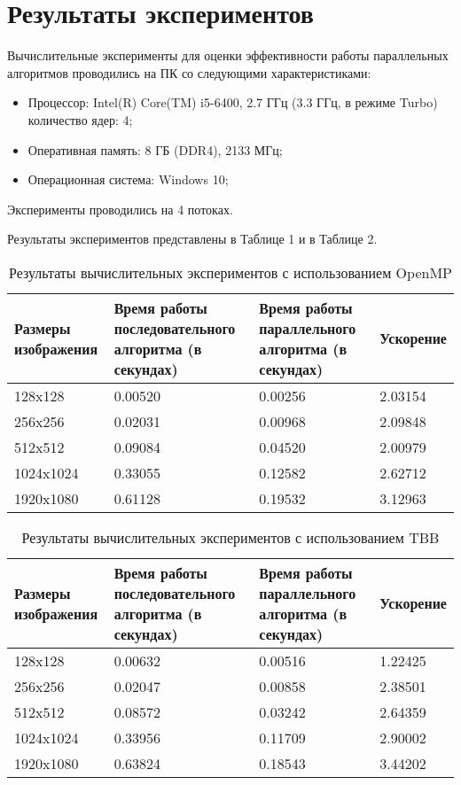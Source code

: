 \documentclass{report}
\begin{document}
\section*{Результаты экспериментов}
Вычислительные эксперименты для оценки эффективности работы параллельных алгоритмов проводились на ПК со следующими характеристиками:
\begin{itemize}
	\item Процессор: Intel(R) Core(TM) i5-6400, 2.7 ГГц (3.3 ГГц, в режиме Turbo) количество ядер: 4;
	\item Оперативная память: 8 ГБ (DDR4), 2133 МГц;
	\item Операционная система: Windows 10;
\end{itemize}
\par Эксперименты проводились на 4 потоках.
\par Результаты экспериментов представлены в Таблице 1 и в Таблице 2.
\begin{table}[!h]
\caption{Результаты вычислительных экспериментов с использованием OpenMP}
\centering
\begin{tabular}{| p{2cm} | p{3cm} | p{4cm} | p{2cm} |}
\hline
Размеры изображения & Время работы последовательного алгоритма (в секундах) & Время работы параллельного алгоритма (в секундах) & Ускорение  \\[5pt]
\hline
128x128        & 0.00520       & 0.00256      & 2.03154       \\
256x256        & 0.02031       & 0.00968      & 2.09848       \\
512x512        & 0.09084       & 0.04520      & 2.00979       \\
1024x1024        & 0.33055       & 0.12582      & 2.62712       \\
1920x1080        & 0.61128       & 0.19532      & 3.12963       \\
\hline
\end{tabular}
\end{table}

\begin{table}[!h]
\caption{Результаты вычислительных экспериментов с использованием TBB}
\centering
\begin{tabular}{| p{2cm} | p{3cm} | p{4cm} | p{2cm} |}
\hline
Размеры изображения & Время работы последовательного алгоритма (в секундах) & Время работы параллельного алгоритма (в секундах) & Ускорение  \\[5pt]
\hline
128x128        & 0.00632       & 0.00516      & 1.22425       \\
256x256        & 0.02047       & 0.00858      & 2.38501       \\
512x512        & 0.08572       & 0.03242      & 2.64359       \\
1024x1024        & 0.33956       & 0.11709      & 2.90002       \\
1920x1080        & 0.63824       & 0.18543      & 3.44202       \\
\hline
\end{tabular}
\end{table}
\end{document}
